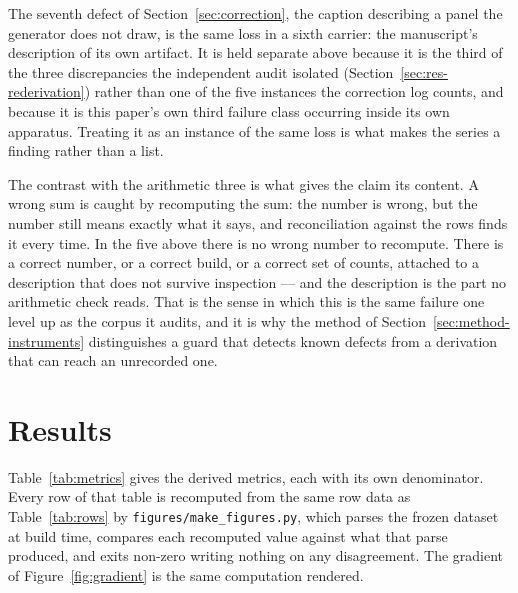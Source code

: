 \documentclass[sigconf,review]{acmart}
\begin{document}
The seventh defect of Section~\ref{sec:correction}, the caption describing a
panel the generator does not draw, is the same loss in a sixth carrier: the
manuscript's description of its own artifact. It is held separate above because
it is the third of the three discrepancies the independent audit isolated
(Section~\ref{sec:res-rederivation}) rather than one of the five instances the
correction log counts, and because it is this paper's own third failure class
occurring inside its own apparatus. Treating it as an instance of the same loss
is what makes the series a finding rather than a list.

The contrast with the arithmetic three is what gives the claim its content. A
wrong sum is caught by recomputing the sum: the number is wrong, but the number
still means exactly what it says, and reconciliation against the rows finds it
every time. In the five above there is no wrong number to recompute. There is a
correct number, or a correct build, or a correct set of counts, attached to a
description that does not survive inspection --- and the description is the part
no arithmetic check reads. That is the sense in which this is the same failure
one level up as the corpus it audits, and it is why the method of
Section~\ref{sec:method-instruments} distinguishes a guard that detects known
defects from a derivation that can reach an unrecorded one.

\section{Results}
\label{sec:results}

Table~\ref{tab:metrics} gives the derived metrics, each with its own
denominator. Every row of that table is recomputed from the same row data as
Table~\ref{tab:rows} by \texttt{figures/make\_figures.py}, which parses the
frozen dataset at build time, compares each recomputed value against what that
parse produced, and exits non-zero writing nothing on any disagreement. The
gradient of Figure~\ref{fig:gradient} is the same computation rendered.
\end{document}
